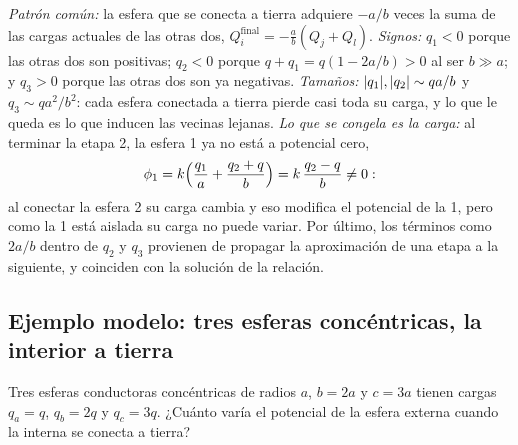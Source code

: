 \begin{observacion}\label{obs:sem-triangulo}
\emph{Patrón común:} la esfera que se conecta a tierra adquiere $-a/b$ veces la suma de las cargas actuales de las otras dos, $Q_i^{\mathrm{final}}=-\frac{a}{b}(Q_j+Q_l)$.
\emph{Signos:} $q_1<0$ porque las otras dos son positivas; $q_2<0$ porque $q+q_1=q(1-2a/b)>0$ al ser $b\gg a$; y $q_3>0$ porque las otras dos son ya negativas.
\emph{Tamaños:} $\lvert q_1\rvert,\lvert q_2\rvert\sim qa/b$ y $q_3\sim qa^{2}/b^{2}$: cada esfera conectada a tierra pierde casi toda su carga, y lo que le queda es lo que
inducen las vecinas lejanas. \emph{Lo que se congela es la carga:} al terminar la etapa 2, la esfera 1 ya no está a potencial cero,
\[
  \phi_1=k\Bigl(\frac{q_1}{a}+\frac{q_2+q}{b}\Bigr)=k\,\frac{q_2-q}{b}\neq0 :
\]
al conectar la esfera 2 su carga cambia y eso modifica el potencial de la 1, pero como la 1 está aislada su carga no puede variar. Por último, los términos como
$2a/b$ dentro de $q_2$ y $q_3$ provienen de propagar la aproximación de una etapa a la siguiente, y coinciden con la solución de la relación.
\end{observacion}

\subsection{Ejemplo modelo: tres esferas concéntricas, la interior a tierra}\label{sem:modelo}
\begin{problema}\label{prob:modelo}
Tres esferas conductoras concéntricas de radios $a$, $b=2a$ y $c=3a$ tienen cargas $q_a=q$, $q_b=2q$ y $q_c=3q$. ¿Cuánto varía el potencial de la esfera
externa cuando la interna se conecta a tierra?
\end{problema}

